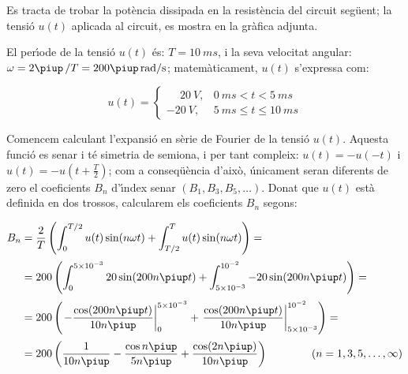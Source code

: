 \begin{exemple}
     Es tracta de trobar la pot\`{e}ncia
     dissipada en la resist\`{e}ncia del circuit seg\"{u}ent; la tensi\'{o} $u(t)$ aplicada al circuit,
     es mostra en la gr\`{a}fica adjunta.

    \begin{center}
        
    \end{center}

     El per\'{\i}ode de la tensi\'{o} $u(t)$ \'{e}s: $T=\SI{10}{ms}$, i la
    seva velocitat angular: $\omega = 2\piup\,/T = 200\piup\unit{rad/s}$;
    matem\`{a}ticament, $u(t)$ s'expressa com:

    \[
    u(t) = \begin{cases} \phantom{-}\SI{20}{V}, & \SI{0}{ms} < t < \SI{5}{ms} \\
           \SI{-20}{V}, & \SI{5}{ms} \leq t \leq \SI{10}{ms} \end{cases}
    \]

    Comencem calculant l'expansi\'{o} en s\`{e}rie de Fourier de la tensi\'{o}
    $u(t)$. Aquesta funci\'{o} es senar i t\'{e} simetria de semiona, i per tant
     compleix: $u(t)=-u(-t)$ i $u(t) = -u(t+\frac{T}{2})$; com a
    conseq\"{u}\`{e}ncia d'aix\`{o}, \'{u}nicament seran diferents de zero el
    coeficients $B_n$ d'\'{\i}ndex senar $(B_1,B_3,B_5,\ldots)$. Donat que
    $u(t)$ est\`{a} definida en dos trossos, calcularem els coeficients
    $B_n$ segons:

    \[
    \begin{split}
        B_n &= \frac{2}{T} \left( \int_0^{T/2} u(t) \sin(n \omega t) +
        \int_{T/2}^{T} u(t) \sin(n \omega t) \right) =\\[0.5ex]
        &= 200 \left( \int_0^{5\times 10^{-3}} 20 \sin(200 n \piup t) +
        \int_{5\times 10^{-3}}^{10^{-2}} -20 \sin(200 n \piup t) \right) =\\[0.5ex]
        &= 200 \left( \left. -\frac{\cos(200 n \piup t)}{10 n \piup}\right|_0^{5\times 10^{-3}}
        +  \left.\frac{\cos(200 n \piup t)}{10 n \piup}\right|_{5\times
        10^{-3}}^{10^{-2}}\right)=\\[0.5ex]
        &= 200\left( \frac{1}{10 n \piup} - \frac{\cos n \piup}{5 n \piup} +
        \frac{\cos (2 n \piup)}{10 n \piup}\right)
        \qquad\qquad(n=1,3,5,\ldots,\infty)
    \end{split}
    \]


\end{exemple}
